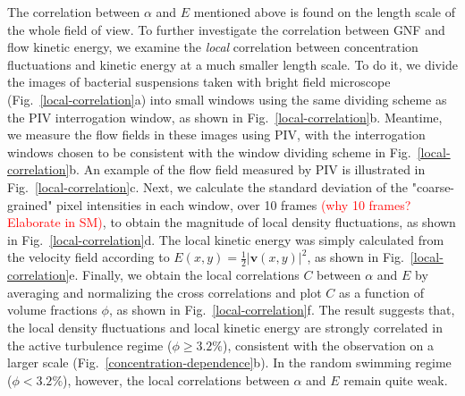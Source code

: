 \documentclass[twocolumn,aps,prl,amsmath,amssymb,longbibliography]{revtex4-2}
\begin{document}
The correlation between $\alpha$ and $E$ mentioned above is found on the length scale of the whole field of view.
To further investigate the correlation between GNF and flow kinetic energy, we examine the \emph{local} correlation between concentration fluctuations and kinetic energy at a much smaller length scale.
To do it, we divide the images of bacterial suspensions taken with bright field microscope (Fig.~\ref{local-correlation}a) into small windows using the same dividing scheme as the PIV interrogation window, as shown in Fig.~\ref{local-correlation}b.
Meantime, we measure the flow fields in these images using PIV, with the interrogation windows chosen to be consistent with the window dividing scheme in Fig.~\ref{local-correlation}b.
An example of the flow field measured by PIV is illustrated in Fig.~\ref{local-correlation}c.
Next, we calculate the standard deviation of the "coarse-grained" pixel intensities in each window, over 10 frames \textcolor{red}{(why 10 frames? Elaborate in SM)}, to obtain the magnitude of local density fluctuations, as shown in Fig.~\ref{local-correlation}d.
The local kinetic energy was simply calculated from the velocity field according to $E(x, y) = \frac{1}{2}|\boldsymbol{v}(x, y)|^2$, as shown in Fig.~\ref{local-correlation}e.
Finally, we obtain the local correlations $C$ between $\alpha$ and $E$ by averaging and normalizing the cross correlations and plot $C$ as a function of volume fractions $\phi$, as shown in Fig.~\ref{local-correlation}f. The result suggests that, the local density fluctuations and local kinetic energy are strongly correlated in the active turbulence regime ($\phi\ge3.2\%$), consistent with the observation on a larger scale (Fig.~\ref{concentration-dependence}b).
In the random swimming regime ($\phi<3.2\%$), however, the local correlations between $\alpha$ and $E$ remain quite weak.
\end{document}

